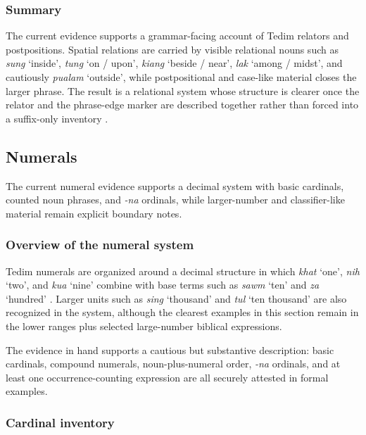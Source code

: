 \documentclass[
  11pt,
  a4paper,
]{article}
\newcommand{\tdim}[1]{\textit{#1}}
\newcommand{\glossquote}[1]{`#1'}
\begin{document}
\subsubsection{Summary}\label{summary-1}

The current evidence supports a grammar-facing account of Tedim relators
and postpositions. Spatial relations are carried by visible relational
nouns such as \tdim{sung} \glossquote{inside}, \tdim{tung}
\glossquote{on / upon}, \tdim{kiang} \glossquote{beside / near},
\tdim{lak} \glossquote{among / midst}, and cautiously \tdim{pualam}
\glossquote{outside}, while postpositional and case-like material closes
the larger phrase. The result is a relational system whose structure is
clearer once the relator and the phrase-edge marker are described
together rather than forced into a suffix-only inventory
\citep{henderson1965, zamngaihcing2017}.

\subsection{Numerals}\label{numerals}

The current numeral evidence supports a decimal system with basic
cardinals, counted noun phrases, and \tdim{-na} ordinals, while
larger-number and classifier-like material remain explicit boundary
notes.

\subsubsection{Overview of the numeral
system}\label{overview-of-the-numeral-system}

Tedim numerals are organized around a decimal structure in which
\tdim{khat} \glossquote{one}, \tdim{nih} \glossquote{two}, and
\tdim{kua} \glossquote{nine} combine with base terms such as \tdim{sawm}
\glossquote{ten} and \tdim{za} \glossquote{hundred}
\citep{zamngaihcing2017, henderson1965}. Larger units such as
\tdim{sing} \glossquote{thousand} and \tdim{tul}
\glossquote{ten thousand} are also recognized in the system, although
the clearest examples in this section remain in the lower ranges plus
selected large-number biblical expressions.

The evidence in hand supports a cautious but substantive description:
basic cardinals, compound numerals, noun-plus-numeral order, \tdim{-na}
ordinals, and at least one occurrence-counting expression are all
securely attested in formal examples.

\subsubsection{Cardinal inventory}\label{cardinal-inventory}
\end{document}
